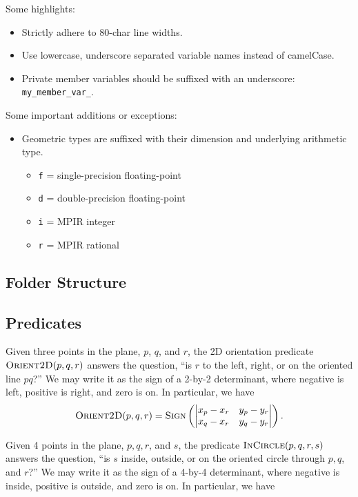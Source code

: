 Some highlights:

\begin{itemize}
  \item Strictly adhere to 80-char line widths.
  \item Use lowercase, underscore separated variable names instead of
  camelCase.
  \item Private member variables should be suffixed with an underscore:
  \texttt{my\_member\_var\_}.
\end{itemize}

Some important additions or exceptions:

\begin{itemize}
  \item Geometric types are suffixed with their dimension and underlying
  arithmetic type.
  \begin{itemize}
    \item \texttt{f} = single-precision floating-point
    \item \texttt{d} = double-precision floating-point
    \item \texttt{i} = MPIR integer
    \item \texttt{r} = MPIR rational
  \end{itemize}
\end{itemize}
  

\subsection{Folder Structure}\label{appdx:folder-structure}

\subsection{Predicates}

Given three points in the plane, $p$, $q$, and $r$, the 2D orientation predicate
$\textsc{Orient2D}(p, q, r)$ answers the question, ``is $r$ to the left, right,
or on the oriented line $pq$?'' We may write it as the sign of a 2-by-2
determinant, where negative is left, positive is right, and zero is on. In
particular, we have 
\[
\textsc{Orient2D}(p, q, r) = \textsc{Sign}
\left(
	\begin{vmatrix} 
		x_p-x_r & y_p-y_r \\ 
		x_q-x_r & y_q-y_r 
	\end{vmatrix} 
\right).
\]
 

Given 4 points in the plane, $p, q, r$, and $s$, the predicate
$\textsc{InCircle}(p, q, r, s)$ answers the question, ``is $s$ inside, outside,
or on the oriented circle through $p, q$, and $r$?'' We may write it as the sign
of a 4-by-4 determinant, where negative is inside, positive is outside, and zero
is on. In particular, we have

